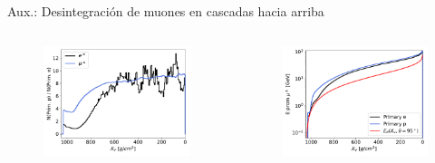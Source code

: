 \documentclass{beamer}
\begin{document}
\begin{frame}[noframenumbering]{Aux.: Desintegración de muones en cascadas hacia arriba}
	\begin{columns}
		\begin{figure}[H]
			\centering
			\includegraphics[width=1\linewidth]{figures/cascadas/frac_emu_Primpe}
		\end{figure}
		\begin{figure}[H]
			\centering
			\includegraphics[width=1\linewidth]{figures/cascadas/evol_Emu_Primpe}
		\end{figure}
	\end{columns}
\end{frame}
\end{document}

